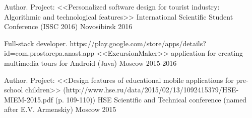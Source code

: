 \begin{cventries}








\cventry
{Author. Project: <<Personalized software design for tourist industry: Algorithmic and technological features>>} %
{International Scientific Student Conference (ISSC 2016)} %
{Novosibirsk} %
{2016} %
{}


\cventry
{Full-stack developer. https://play.google.com/store/apps/details?id=com.prostorepa.anast.app} %
{<<ExcursionMaker>> application for creating multimedia tours for Android  (Java) } %
{Moscow} %
{2015-2016} %
{}

\cventry
{Author. Project: <<Design features of educational mobile applications for pre-school children>> (http://www.hse.ru/data/2015/02/13/1092415379/HSE-MIEM-2015.pdf (p. 109-110))} %
{HSE Scientific and Technical conference (named after E.V. Armenskiy)} %
{Moscow} %
{2015} %
{}


\end{cventries}
